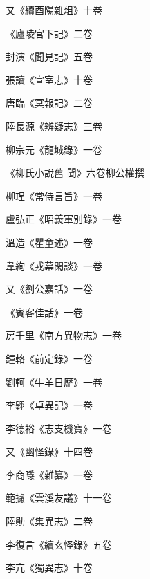 \begin{pinyinscope}
 又《續酉陽雜俎》十卷



 《廬陵官下記》二卷



 封演《聞見記》五卷



 張讀《宣室志》十卷



 唐臨《冥報記》二卷



 陸長源《辨疑志》三卷



 柳宗元《龍城錄》一卷



 《柳氏小說舊
 聞》六卷柳公權撰



 柳珵《常侍言旨》一卷



 盧弘正《昭義軍別錄》一卷



 溫造《瞿童述》一卷



 韋絢《戎幕閑談》一卷



 又《劉公嘉話》一卷



 《賓客佳話》一卷



 房千里《南方異物志》一卷



 鐘輅《前定錄》一卷



 劉軻《牛羊日歷》一卷



 李翱《卓異記》一卷



 李德裕《志支機寶》一卷



 又《幽怪錄》十四卷



 李商隱《雜纂》一卷



 範攄《雲溪友議》十一卷



 陸勛《集異志》二卷



 李復言《續玄怪錄》五卷



 李亢《獨異志》十卷




\end{pinyinscope}
